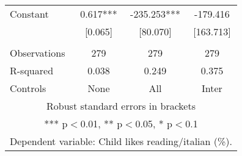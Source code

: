\begin{tabular}{lccc}
Constant & 0.617*** & -235.253*** & -179.416 \\
 & [0.065] & [80.070] & [163.713] \\
 &  &  &  \\
Observations & 279 & 279 & 279 \\
R-squared & 0.038 & 0.249 & 0.375 \\
 Controls & None & All & Inter \\ \hline
\multicolumn{4}{c}{ Robust standard errors in brackets} \\
\multicolumn{4}{c}{ *** p$<$0.01, ** p$<$0.05, * p$<$0.1} \\
\multicolumn{4}{c}{ Dependent variable: Child likes reading/italian (\%).} \\
\end{tabular}
